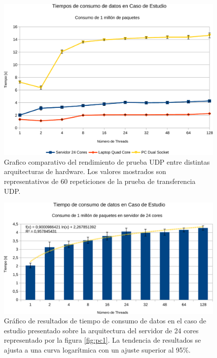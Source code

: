 \begin{figure}[h!]
	\centering
	\includegraphics[scale=0.6]{resultados/transferenciaUDP1-crop.pdf}
	\caption{Grafico comparativo del rendimiento de prueba UDP entre distintas arquitecturas de hardware. Los valores mostrados son representativos de 60 repeticiones de la prueba de transferencia UDP.}
	\label{fig:tests_arch}
\end{figure}

\begin{figure}[h!]
	\centering
	\includegraphics[scale=0.6]{resultados/transferenciaUDP2-crop.pdf}
	\caption{Gráfico de resultados de tiempo de consumo de datos en el caso de estudio presentado sobre la arquitectura del servidor de 24 cores representado por la figura \ref{fig:pc1}. La tendencia de resultados se ajusta a una curva logarítmica con un ajuste superior al 95\%.}
	\label{fig:tests_arch_detalle24}
\end{figure}

